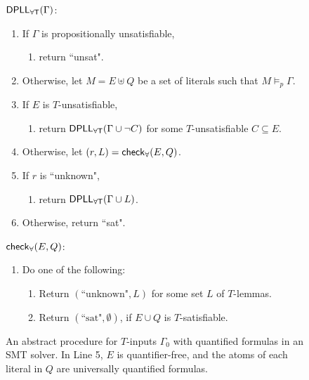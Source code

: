 \documentclass[oribibl]{llncs}
\begin{document}
\begin{figure}[t]
\begin{framed}
\begin{internallinenumbers}
$\small\mathsf{DPLL_{\forall T}}( \Gamma )$:
\begin{enumerate}
\item[\ ] If $\Gamma$ is propositionally unsatisfiable,
\begin{enumerate}
\item[\ ] return ``unsat".
\end{enumerate}
\item[\ ] Otherwise, let $M = E \uplus Q$ be a set of literals such that $M \models_p \Gamma$.
\item[\ ] If $E$ is $T$-unsatisfiable,
\begin{enumerate}
\item[\ ] return $\small\mathsf{DPLL_{\forall T}}( \Gamma \cup \neg C )$ for some $T$-unsatisfiable $C \subseteq E$.
\end{enumerate}
\item[\ ] Otherwise, let $( r, L ) = \small\mathsf{check}_\forall( E, Q )$.
\item[\ ] If $r$ is ``unknown",
\begin{enumerate}
\item[\ ] return $\small\mathsf{DPLL_{\forall T}}( \Gamma \cup L )$.
\end{enumerate}
\item[\ ] Otherwise, return ``sat".
\end{enumerate}
$\small\mathsf{check}_\forall( E, Q )$:
\begin{enumerate}
\item[\ ] Do one of the following:
\begin{enumerate}
\item[\ ] Return $( \text{``unknown"}, L )$ for some set $L$ of $T$-lemmas.
\item[\ ] Return $( \text{``sat"}, \emptyset )$, if $E \cup Q$ is $T$-satisfiable.
\end{enumerate}
\end{enumerate}
\end{internallinenumbers}
\end{framed}
\vspace{-2ex}
\caption{An abstract procedure for $T$-inputs $\Gamma_0$ with quantified formulas in an SMT solver.
In Line 5, $E$ is quantifier-free, and the atoms of each literal in $Q$ are universally quantified formulas.
\label{fig:smtq}}
\end{figure}
\end{document}
